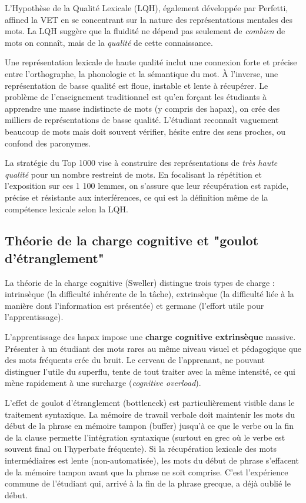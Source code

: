 {L'Hypothèse de la Qualité Lexicale (LQH), également développée par Perfetti, affined la VET en se
concentrant sur la nature des représentations mentales des mots. La LQH suggère que la fluidité ne
dépend pas seulement de \textit{combien} de mots on connaît, mais de la \textit{qualité} de cette
connaissance.\cite{III-1-1-ref28}

Une représentation lexicale de haute qualité inclut une connexion forte et précise entre
l'orthographe, la phonologie et la sémantique du mot. À l'inverse, une représentation de \og basse
qualité\fg{} est floue, instable et lente à récupérer. Le problème de l'enseignement traditionnel
est qu'en forçant les étudiants à apprendre une masse indistincte de mots (y compris des hapax), on
crée des milliers de représentations de basse qualité. L'étudiant \og reconnaît vaguement\fg{}
beaucoup de mots mais doit souvent vérifier, hésite entre des sens proches, ou confond des
paronymes.

La stratégie du \og Top 1000\fg{} vise à construire des représentations de \textit{très haute
qualité} pour un nombre restreint de mots. En focalisant la répétition et l'exposition sur ces 1 100
lemmes, on s'assure que leur récupération est rapide, précise et résistante aux interférences, ce
qui est la définition même de la compétence lexicale selon la LQH.\cite{III-1-1-ref31}



\subsection{Théorie de la charge cognitive et "goulot d'étranglement"}

La théorie de la charge cognitive (Sweller) distingue trois types de charge : intrinsèque (la
difficulté inhérente de la tâche), extrinsèque (la difficulté liée à la manière dont l'information
est présentée) et germane (l'effort utile pour l'apprentissage).\cite{III-1-1-ref33}

L'apprentissage des hapax impose une \textbf{charge cognitive extrinsèque} massive. Présenter à un
étudiant des mots rares au même niveau visuel et pédagogique que des mots fréquents crée du \og
bruit\fg{}. Le cerveau de l'apprenant, ne pouvant distinguer l'utile du superflu, tente de tout
traiter avec la même intensité, ce qui mène rapidement à une surcharge (\textit{cognitive
overload}).\cite{III-1-1-ref35}

L'effet de goulot d'étranglement (bottleneck) est particulièrement visible dans le traitement
syntaxique. La mémoire de travail verbale doit maintenir les mots du début de la phrase en mémoire
tampon (buffer) jusqu'à ce que le verbe ou la fin de la clause permette l'intégration syntaxique
(surtout en grec où le verbe est souvent final ou l'hyperbate fréquente).\cite{III-1-1-ref37} Si la
récupération lexicale des mots intermédiaires est lente (non-automatisée), les mots du début de
phrase s'effacent de la mémoire tampon avant que la phrase ne soit comprise. C'est l'expérience
commune de l'étudiant qui, arrivé à la fin de la phrase grecque, a déjà oublié le
début.\cite{III-1-1-ref39}

}
